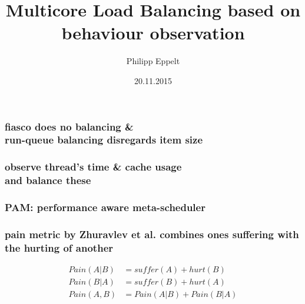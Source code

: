 \documentclass[utf8,10pt]{beamer}
\title[]{Multicore Load Balancing based on behaviour observation}
\author{Philipp Eppelt}
\date{20.11.2015}
\begin{document}
\maketitle

\large

\newcommand{\ft}[1]{\frametitle{\hfill #1}}


\begin{frame}
  \frametitle{fiasco does no balancing \& \\ run-queue balancing disregards
  item size}
  \centering
  \begin{minipage}[l]{.49\columnwidth}
    
  \end{minipage}
  \begin{minipage}[r]{.49\columnwidth}
    
  \end{minipage}
\end{frame}


\begin{frame}
  \frametitle{observe thread's time \& cache usage \\ and balance these}
  \centering
  \begin{minipage}[l]{.49\columnwidth}
    
  \end{minipage}
  \begin{minipage}[r]{.49\columnwidth}
    
  \end{minipage}
\end{frame}




\begin{frame}
  \frametitle{PAM: performance aware meta-scheduler}
\end{frame}
\begin{frame}
  \frametitle{pain metric by Zhuravlev et al. combines ones suffering with the
  hurting of another}
  \centering
  \begin{align*}
    Pain(A|B) &= suffer(A) + hurt(B) \\
    Pain(B|A) &= suffer(B) + hurt(A) \\
    Pain(A,B) &= Pain(A|B) + Pain(B|A)
  \end{align*}
\end{frame}
\end{document}
